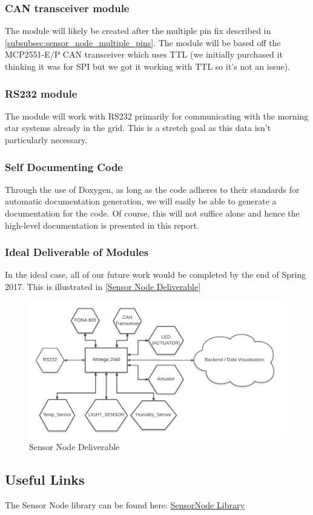 \documentclass{article}
\begin{document}
\subsubsection{CAN transceiver module}

The module will likely be created after the multiple pin fix described in \autoref{subsubsec:sensor_node_multiple_pins}. The module will be based off the MCP2551-E/P CAN transceiver which uses TTL (we initially purchased it thinking it was for SPI but we got it working with TTL so it's not an issue).

\subsubsection{RS232 module}

The module will work with RS232 primarily for communicating with the morning star systems already in the grid. This is a stretch goal as this data isn't particularly necessary.

\subsubsection{Self Documenting Code}

Through the use of Doxygen, as long as the code adheres to their standards for automatic documentation generation, we will easily be able to generate a documentation for the code. Of course, this will not suffice alone and hence the high-level documentation is presented in this report.

\subsubsection{Ideal Deliverable of Modules}

In the ideal case, all of our future work would be completed by the end of Spring 2017. This is illustrated in \autoref{Sensor Node Deliverable}

\begin{figure}[h!]
    \centering
        \includegraphics[width=\linewidth]{Sensor_Node_Deliverable.png}
        \caption{Sensor Node Deliverable}
        \label{Sensor Node Deliverable}
\end{figure}

\subsection{Useful Links}

The Sensor Node library can be found here:
\href{https://github.com/legendddhgf/SensorNode}{SensorNode Library}\\
\end{document}

